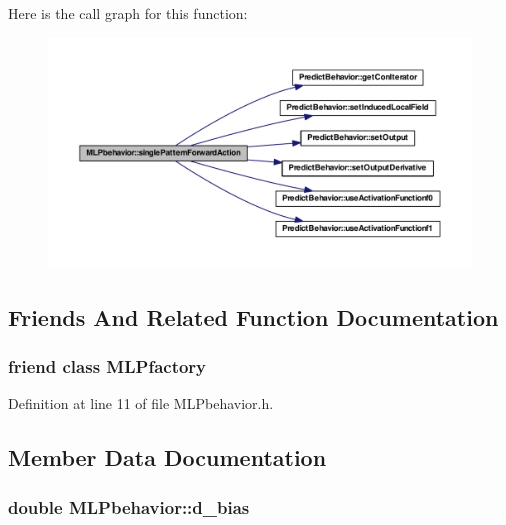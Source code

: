Here is the call graph for this function:
\nopagebreak
\begin{figure}[H]
\begin{center}
\leavevmode
\includegraphics[width=400pt]{class_m_l_pbehavior_a2f91bc3f2e558b92f5beb5e45402e6c7_cgraph}
\end{center}
\end{figure}




\subsection{Friends And Related Function Documentation}
\hypertarget{class_m_l_pbehavior_a1aa48940238b9487734e590ffab33a1b}{
\subsubsection[{MLPfactory}]{\setlength{\rightskip}{0pt plus 5cm}friend class {\bf MLPfactory}}}
\label{class_m_l_pbehavior_a1aa48940238b9487734e590ffab33a1b}


Definition at line 11 of file MLPbehavior.h.



\subsection{Member Data Documentation}
\hypertarget{class_m_l_pbehavior_a6206785c5c3f838a0538f9f77fa7a25a}{
\subsubsection[{d\_\-bias}]{\setlength{\rightskip}{0pt plus 5cm}double {\bf MLPbehavior::d\_\-bias}}}
\label{class_m_l_pbehavior_a6206785c5c3f838a0538f9f77fa7a25a}


